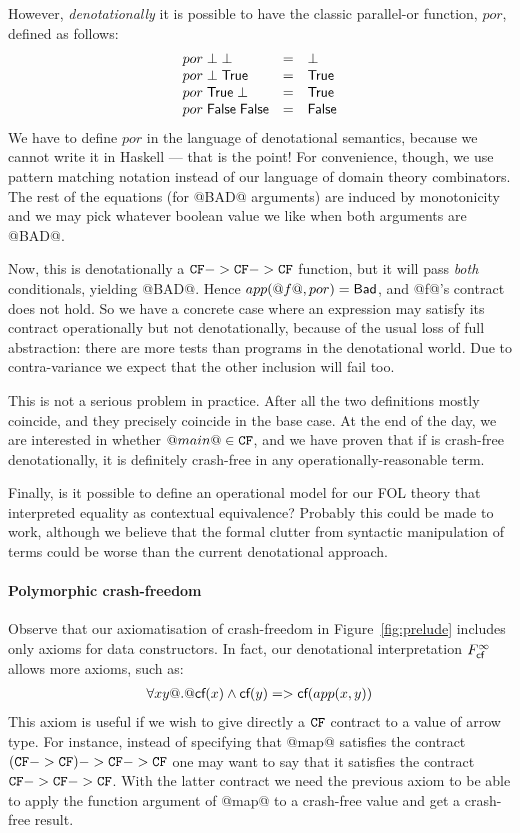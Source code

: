 However, \emph{denotationally} it is possible to have the classic 
parallel-or function, $por$, defined as 
follows:
\[\begin{array}{lcl}
  por\;\bot\;\bot & = & \bot \\ 
  por\;\bot\;\mathsf{True} & = & \mathsf{True} \\
  por\;\mathsf{True}\;\bot & = & \mathsf{True} \\ 
  por\;\mathsf{False}\;\mathsf{False} & = & \mathsf{False}
\end{array}\] 
We have to define $por$ in the language of denotational semantics, because
we cannot write it in Haskell --- that is the point!  For convenience, 
though, we use pattern matching notation instead of our 
language of domain theory combinators.
The rest of the equations (for @BAD@ arguments) are induced by
monotonicity and we may pick whatever boolean value we like when both
arguments are @BAD@.

Now, this is denotationally a ${\tt CF} -> {\tt CF} -> {\tt CF}$ function, but it
will pass \emph{both} conditionals, 
yielding @BAD@. Hence $app(@f@,por) = \mathsf{Bad}$, and @f@'s contract does not hold.
So we have a concrete case where an expression may satisfy its
contract operationally but not denotationally, because of the usual
loss of full abstraction: there are more tests than programs in the denotational world. 
Due to contra-variance
we expect that the other inclusion will fail too. 

This is not a serious problem in practice.
After all the two definitions mostly coincide, and
they precisely coincide in the base case.  At the end of the day, we
are interested in whether $@main@ \in {\tt CF}$, and we have proven that if
is crash-free denotationally, it is definitely crash-free in any
operationally-reasonable term.

Finally, is it possible to define an operational model for our FOL theory that interpreted
equality as contextual equivalence? Probably this could be made to work, although we believe
that the formal clutter from syntactic manipulation of terms could be worse than the current
denotational approach. 


\paragraph{Polymorphic crash-freedom}

Observe that our axiomatisation of crash-freedom in Figure~\ref{fig:prelude} 
includes only axioms for data constructors. In fact, our denotational interpretation
$F_{\textsf{cf}}^{\infty}$ allows more axioms, such as:
\[\begin{array}{l}
    \forall x y @.@ \textsf{cf}(x) \land \textsf{cf}(y) => \textsf{cf}(app(x,y))
\end{array}\] 
This axiom is useful if we wish to give directly a ${\tt CF}$ contract to a value of 
arrow type. For instance, instead of specifying that @map@ satisfies the contract
$({\tt CF} -> {\tt CF}) -> {\tt CF} -> {\tt CF}$ one may want to say that it satisfies the contract
${\tt CF} -> {\tt CF} -> {\tt CF}$. With the latter contract we need the previous axiom to be 
able to apply the function argument of @map@ to a crash-free value and get a 
crash-free result. 

